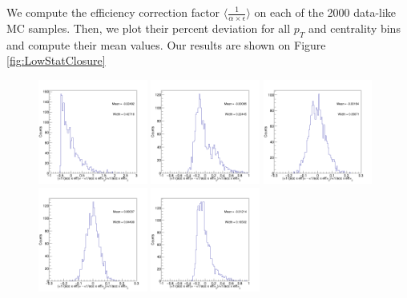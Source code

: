 We compute the efficiency correction factor $\langle \frac{1}{\alpha \times \epsilon}\rangle$ on each of the 2000 data-like MC samples. Then, we plot their percent deviation for all $p_T$ and centrality bins and compute their mean values. Our results are shown on Figure \ref{fig:LowStatClosure}

\begin{figure}[h]
\begin{center}
\includegraphics[width= 0.32\textwidth]{Figures/Chapter5/BsEffONLY_0_90_0.png}
\includegraphics[width= 0.32\textwidth]{Figures/Chapter5/BsEffONLY_0_90_1.png}
\includegraphics[width= 0.32\textwidth]{Figures/Chapter5/BsEffONLY_0_90_2.png}
\includegraphics[width= 0.32\textwidth]{Figures/Chapter5/BsEffONLY_0_90_3.png}
\includegraphics[width= 0.32\textwidth]{Figures/Chapter5/BsEffONLY_0_30_-1.png}

\end{center}
\end{figure}
